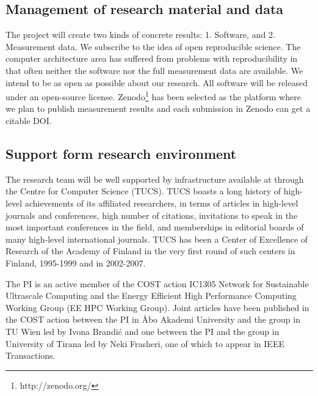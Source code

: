 \documentclass{article}
\begin{document}
\subsection{Management of research material and data}
The project will create two kinds of concrete results: 1. Software, and 2. Measurement data. 
We subscribe to the idea of open reproducible science. 
The computer architecture area has suffered from problems with reproducibility in that often neither the software nor the full measurement data are available. 
We intend to be as open as possible about our research. 
All software will be released under an open-source license. 
Zenodo\footnote{http://zenodo.org/} has been selected as the platform where we plan to publish measurement results and each submission in Zenodo can get a citable DOI.

\subsection{Support form research environment}
The research team will be well supported by infrastructure available at through the Centre for Computer Science (TUCS).
TUCS boasts a long history of high-level achievements of its affiliated researchers, in terms of articles in high-level journals and conferences, high number of citations, 
invitations to speak in the most important conferences in the field, and memberships in editorial boards of many high-level international journals. 
TUCS has been a Center of Excellence of Research of the Academy of Finland in the very first round of such centers in Finland, 1995-1999 and in 2002-2007. 


The PI is an active member of the COST action IC1305 Network for Sustainable Ultrascale Computing and the Energy Efficient High Performance Computing Working Group (EE HPC Working Group). 
Joint articles have been published in the COST action between the PI in \AA{}bo Akademi University and the group in TU Wien led by Ivona Brandi\'{c} and one between the PI and the group in University of Tirana led by Neki Frasheri, one of which to appear in IEEE Transactions.\smallskip
\end{document}
